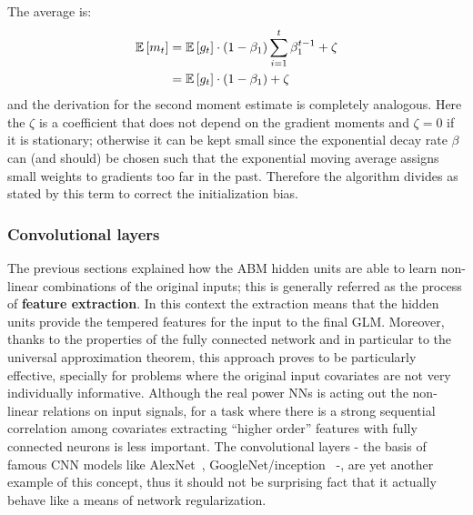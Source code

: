 The average is:
\begin{align*}
    \mathbb{E} \left[ m_t \right] &= \mathbb{E} \left[ g_t \right] \cdot (1-\beta_1) \sum_{i=1}^t \beta_1^{t-1} + \zeta \\
                      &= \mathbb{E} \left[ g_t \right] \cdot (1-\beta_1) + \zeta
\end{align*}
and the derivation for the second moment estimate is completely analogous.
Here the $\zeta$ is a coefficient that does not depend on the gradient moments and $\zeta = 0$ if it is stationary; otherwise it can be kept small since the exponential decay rate $\beta$ can (and should) be chosen such that the exponential moving average
assigns small weights to gradients too far in the past. Therefore the algorithm divides as stated by this term to correct the initialization bias.


\subsubsection{Convolutional layers}

The previous sections explained how the \ac{ABM} hidden units are able to learn non-linear combinations of the original inputs; this is generally referred as the process of \textbf{feature extraction}. In this context the extraction means that the hidden units provide the tempered features for the input to the final \ac{GLM}. 
%
Moreover, thanks to the properties of the fully connected network and in particular to the universal approximation theorem, this approach proves to be particularly effective, specially for problems where the original input covariates are not very individually informative. 
Although the real power NNs is acting out the non-linear relations on input signals, for a task where there is a strong sequential correlation among covariates extracting “higher order” features with fully connected neurons is less important.
%
The convolutional layers - the basis of famous \ac{CNN} models like AlexNet~\cite{Krizhevsky:2012:ICD:2999134.2999257}, GoogleNet/inception~\cite{7298594} -, are yet another example of this concept, thus it should not be surprising fact that it actually behave like a means of network regularization.


